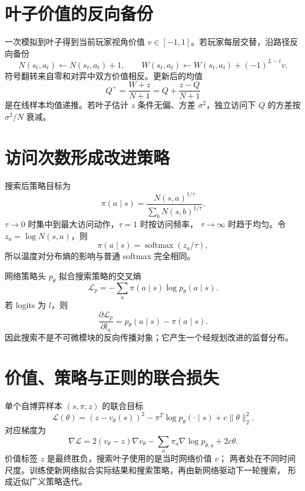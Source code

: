 \documentclass[11pt]{article}
\numberwithin{equation}{section}
\newcommand{\1}{\mathbf{1}}
\newcommand{\cL}{\mathcal{L}}
\begin{document}
\section{叶子价值的反向备份}

一次模拟到叶子得到当前玩家视角价值 $v\in[-1,1]$。若玩家每层交替，沿路径反向备份
\begin{equation}
 N(s_t,a_t)\leftarrow N(s_t,a_t)+1,
 \qquad
 W(s_t,a_t)\leftarrow W(s_t,a_t)+(-1)^{L-t}v.
\end{equation}
符号翻转来自零和对弈中双方价值相反。更新后的均值
\begin{equation}
 Q^+=\frac{W+z}{N+1}
 =Q+\frac{z-Q}{N+1}
\end{equation}
是在线样本均值递推。若叶子估计 $z$ 条件无偏、方差 $\sigma^2$，独立访问下
$Q$ 的方差按 $\sigma^2/N$ 衰减。

\section{访问次数形成改进策略}

搜索后策略目标为
\begin{equation}
 \pi(a\mid s)=\frac{N(s,a)^{1/\tau}}
 {\sum_bN(s,b)^{1/\tau}}.
\end{equation}
$\tau\to0$ 时集中到最大访问动作，$\tau=1$ 时按访问频率，
$\tau\to\infty$ 时趋于均匀。令 $z_a=\log N(s,a)$，则
\begin{equation}
 \pi(a\mid s)=\operatorname{softmax}(z_a/\tau),
\end{equation}
所以温度对分布熵的影响与普通 softmax 完全相同。

网络策略头 $p_\theta$ 拟合搜索策略的交叉熵
\begin{equation}
 \cL_p=-\sum_a\pi(a\mid s)\log p_\theta(a\mid s).
\end{equation}
若 logits 为 $l$，则
\begin{equation}
 \frac{\partial\cL_p}{\partial l_a}=p_\theta(a\mid s)-\pi(a\mid s).
\end{equation}
因此搜索不是不可微模块的反向传播对象；它产生一个经规划改进的监督分布。

\section{价值、策略与正则的联合损失}

单个自博弈样本 $(s,\pi,z)$ 的联合目标
\begin{equation}
 \cL(\theta)=(z-v_\theta(s))^2
 -\pi^T\log p_\theta(\cdot\mid s)
 +c\|\theta\|_2^2.
\end{equation}
对应梯度为
\begin{equation}
 \nabla\cL
 =2(v_\theta-z)\nabla v_\theta
 -\sum_a\pi_a\nabla\log p_{\theta,a}
 +2c\theta.
\end{equation}
价值标签 $z$ 是最终胜负，搜索叶子使用的是当时网络价值 $v$；
两者处在不同时间尺度。训练使新网络拟合实际结果和搜索策略，再由新网络驱动下一轮搜索，
形成近似广义策略迭代。
\end{document}
